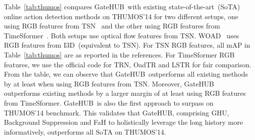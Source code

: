 \documentclass[10pt,twocolumn,letterpaper]{article}
\newcommand{\methodname}{GateHUB}
\begin{document}
%
 Table~\ref{tab:thumos} compares \methodname~with existing state-of-the-art~(SoTA) online action detection methods on THUMOS'14 for two different setups, one using RGB features from TSN~\cite{wang2016temporal} and the other using RGB features from TimeSformer~\cite{bertasius2021space}. Both setups use optical flow features from TSN. WOAD~\cite{gao2020woad} uses RGB features from I3D~(equivalent to TSN). For TSN RGB features, all mAP in Table~\ref{tab:thumos} are as reported in the references. 
For TimeSformer RGB features, we use the official code for TRN, OadTR and LSTR for fair comparison.
From the table, we can observe that \methodname~outperforms all existing methods by at least  when using RGB features from TSN. Moreover, \methodname~ outperforms existing methods by a larger margin of at least  using RGB features from TimeSformer.
\methodname~is also the first approach to surpass  on THUMOS'14 benchmark. 
This validates that \methodname, comprising GHU, Background Suppression and FaH to holistically leverage the long history more informatively, outperforms all SoTA on THUMOS’14.
\end{document}
